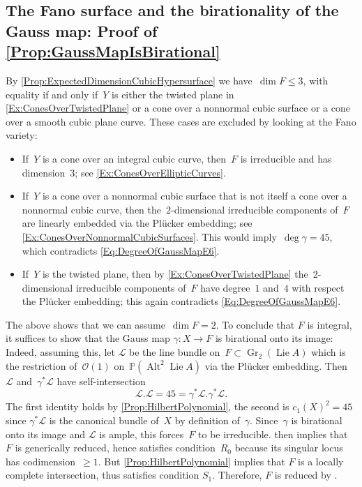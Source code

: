 \documentclass[a4paper]{amsart}
\newcommand{\bbP}{\mathbb{P}}
\newcommand{\cL}{\mathcal{L}}
\newcommand{\cO}{\mathcal{O}}
\DeclareMathOperator{\Gr}{Gr}
\DeclareMathOperator{\Lie}{Lie}
\DeclareMathOperator{\Alt}{Alt}
\renewcommand{\le}{\leqslant}
\renewcommand{\ge}{\geqslant}
\theoremstyle{plain}
\theoremstyle{definition}
\numberwithin{equation}{section}
\begin{document}
\subsection{The Fano surface and the birationality of the Gauss map: Proof of \cref{Prop:GaussMapIsBirational}}
By \cref{Prop:ExpectedDimensionCubicHypersurface} we have~$\dim F \le 3$, with equality if and only if~$Y$ is either the twisted plane in \cref{Ex:ConesOverTwistedPlane} or a cone over a nonnormal cubic surface or a cone over a smooth cubic plane curve. These cases are excluded by looking at the Fano variety:
\begin{itemize}
\item If~$Y$ is a cone over an integral cubic curve, then~$F$ is irreducible and has dimension~$3$; see \cref{Ex:ConesOverEllipticCurves}. \smallskip
\item If~$Y$ is a cone over a nonnormal cubic surface that is not itself a cone over a nonnormal cubic curve, then the~$2$-dimensional irreducible components of~$F$ are linearly embedded via the Pl\"ucker embedding; see \cref{Ex:ConesOverNonnormalCubicSurfaces}. This would imply~$\deg \gamma = 45$, which contradicts \eqref{Eq:DegreeOfGaussMapE6}. \smallskip 
\item If~$Y$ is the twisted plane, then by \cref{Ex:ConesOverTwistedPlane} the~$2$-dimensional irreducible components of~$F$ have degree~$1$ and~$4$ with respect the Pl\"ucker embedding; this again contradicts \eqref{Eq:DegreeOfGaussMapE6}.
\end{itemize}
%
The above shows that we can assume~$\dim F = 2$. To conclude that $F$ is integral, it suffices to show that the Gauss map $\gamma \colon X \to F$ is birational onto its image: Indeed, assuming this, let $\cL$ be the line bundle on~$F\subset \Gr_2(\Lie A)$ which is the restriction of~$\cO(1)$ on~$\bbP(\Alt^2 \Lie A)$ via the Pl\"ucker embedding. Then $\cL$ and~$\gamma^\ast \cL$ have self-intersection
\[ \cL.\cL = 45 = \gamma^\ast \cL.\gamma^\ast \cL.\]
The first identity holds by \cref{Prop:HilbertPolynomial}, the second is $c_1(X)^2 = 45$ since $\gamma^\ast \cL$ is the canonical bundle of~$X$ by definition of~$\gamma$. Since~$\gamma$ is birational onto its image and $\cL$ is ample, this forces~$F$ to be irreducible.  then implies that $F$ is generically reduced, hence satisfies condition~$R_0$ because its singular locus has codimension~$\ge 1$. But \cref{Prop:HilbertPolynomial} implies that $F$ is a locally complete intersection, thus satisfies condition $S_1$. Therefore, $F$ is reduced by \cite[5.8.5]{EGAIV2}.
\end{document}
